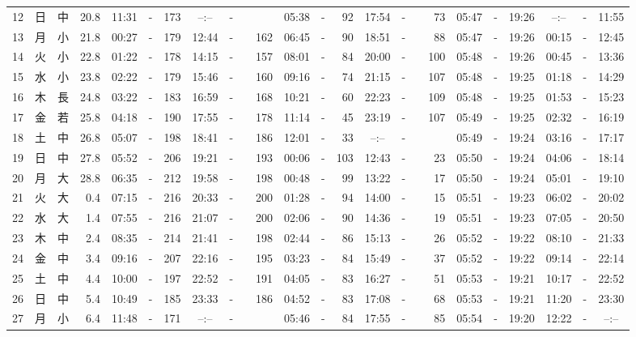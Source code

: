 \documentclass[12pt,a4j]{jsarticle}
\begin{document}
\begin{table}[htbp]
\begin{center}
{\begin{tabular}{|rc|cr|ccrccr|ccrccr|ccc|ccc|}
12 & 日 & 中 & 20.8 &  11:31 &-& 173 &  --:-- &-&~~~~~ &  05:38 &-&  92 &  17:54 &-&  73 & 05:47 & -& 19:26 & --:-- & -& 11:55 \\
13 & 月 & 小 & 21.8 &  00:27 &-& 179 &  12:44 &-& 162 &  06:45 &-&  90 &  18:51 &-&  88 & 05:47 & -& 19:26 & 00:15 & -& 12:45 \\
14 & 火 & 小 & 22.8 &  01:22 &-& 178 &  14:15 &-& 157 &  08:01 &-&  84 &  20:00 &-& 100 & 05:48 & -& 19:26 & 00:45 & -& 13:36 \\
15 & 水 & 小 & 23.8 &  02:22 &-& 179 &  15:46 &-& 160 &  09:16 &-&  74 &  21:15 &-& 107 & 05:48 & -& 19:25 & 01:18 & -& 14:29 \\
16 & 木 & 長 & 24.8 &  03:22 &-& 183 &  16:59 &-& 168 &  10:21 &-&  60 &  22:23 &-& 109 & 05:48 & -& 19:25 & 01:53 & -& 15:23 \\
17 & 金 & 若 & 25.8 &  04:18 &-& 190 &  17:55 &-& 178 &  11:14 &-&  45 &  23:19 &-& 107 & 05:49 & -& 19:25 & 02:32 & -& 16:19 \\
18 & 土 & 中 & 26.8 &  05:07 &-& 198 &  18:41 &-& 186 &  12:01 &-&  33 &  --:-- &-&~~~~~ & 05:49 & -& 19:24 & 03:16 & -& 17:17 \\
19 & 日 & 中 & 27.8 &  05:52 &-& 206 &  19:21 &-& 193 &  00:06 &-& 103 &  12:43 &-&  23 & 05:50 & -& 19:24 & 04:06 & -& 18:14 \\
20 & 月 & 大 & 28.8 &  06:35 &-& 212 &  19:58 &-& 198 &  00:48 &-&  99 &  13:22 &-&  17 & 05:50 & -& 19:24 & 05:01 & -& 19:10 \\
21 & 火 & 大 &  0.4 &  07:15 &-& 216 &  20:33 &-& 200 &  01:28 &-&  94 &  14:00 &-&  15 & 05:51 & -& 19:23 & 06:02 & -& 20:02 \\
22 & 水 & 大 &  1.4 &  07:55 &-& 216 &  21:07 &-& 200 &  02:06 &-&  90 &  14:36 &-&  19 & 05:51 & -& 19:23 & 07:05 & -& 20:50 \\
23 & 木 & 中 &  2.4 &  08:35 &-& 214 &  21:41 &-& 198 &  02:44 &-&  86 &  15:13 &-&  26 & 05:52 & -& 19:22 & 08:10 & -& 21:33 \\
24 & 金 & 中 &  3.4 &  09:16 &-& 207 &  22:16 &-& 195 &  03:23 &-&  84 &  15:49 &-&  37 & 05:52 & -& 19:22 & 09:14 & -& 22:14 \\
25 & 土 & 中 &  4.4 &  10:00 &-& 197 &  22:52 &-& 191 &  04:05 &-&  83 &  16:27 &-&  51 & 05:53 & -& 19:21 & 10:17 & -& 22:52 \\
26 & 日 & 中 &  5.4 &  10:49 &-& 185 &  23:33 &-& 186 &  04:52 &-&  83 &  17:08 &-&  68 & 05:53 & -& 19:21 & 11:20 & -& 23:30 \\
27 & 月 & 小 &  6.4 &  11:48 &-& 171 &  --:-- &-&~~~~~ &  05:46 &-&  84 &  17:55 &-&  85 & 05:54 & -& 19:20 & 12:22 & -& --:-- \\

\end{tabular}}
\end{center}
\end{table}
\end{document}
